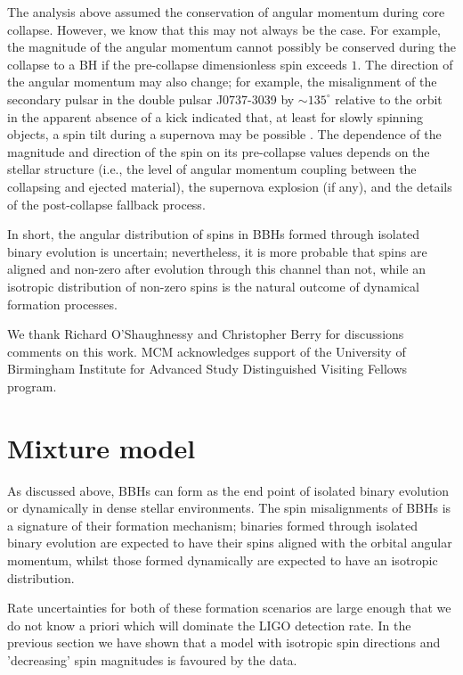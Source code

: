 \documentclass[modern,linenumbers]{aastex61}
\begin{document}
The analysis above assumed the conservation of angular momentum during
core collapse. However, we know that this may not always be the case.
For example, the magnitude of the angular momentum cannot possibly be
conserved during the collapse to a BH if the pre-collapse
dimensionless spin exceeds $1$.  The direction of the angular momentum
may also change; for example, the misalignment of the secondary pulsar
in the double pulsar J0737-3039 by $\sim 135^{\circ}$ relative to
the orbit in the apparent absence of a kick indicated that, at least
for slowly spinning objects, a spin tilt during a supernova may be
possible \citep{2011ApJ...742...81F}.  The dependence of the magnitude
and direction of the spin on its pre-collapse values depends on the
stellar structure (i.e., the level of angular momentum coupling
between the collapsing and ejected material), the supernova explosion
(if any), and the details of the post-collapse fallback process.

In short, the angular distribution of spins in \acp{BBH} formed
through isolated binary evolution is uncertain; nevertheless, it is
more probable that spins are aligned and non-zero after evolution
through this channel than not, while an isotropic distribution of
non-zero spins is the natural outcome of dynamical formation
processes.

\acknowledgements

We thank Richard O’Shaughnessy and Christopher Berry for discussions
comments on this work.  MCM acknowledges support of the University of
Birmingham Institute for Advanced Study Distinguished Visiting Fellows
program.

\appendix

\section{Mixture model}

As discussed above, BBHs can form as the end point of isolated binary evolution or dynamically in dense stellar environments. The spin misalignments of BBHs is a signature of their formation mechanism; binaries formed through isolated binary evolution are expected to have their spins aligned with the orbital angular momentum, whilst those formed dynamically are expected to have an isotropic distribution.

Rate uncertainties for both of these formation scenarios are large enough that we do not know a priori which will dominate the LIGO detection rate. In the previous section we have shown that a model with isotropic spin directions and 'decreasing' spin magnitudes is favoured by the data.
\end{document}
